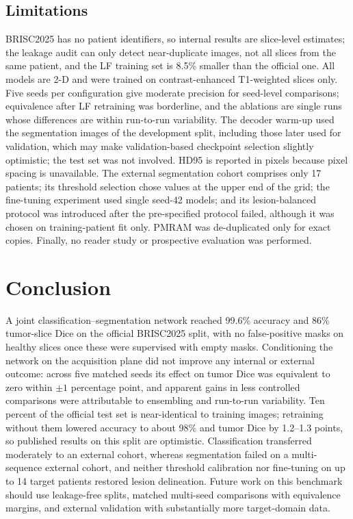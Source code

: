 \documentclass[journal]{IEEEtran}
\begin{document}
\subsection{Limitations}
BRISC2025 has no patient identifiers, so internal results are slice-level estimates; the leakage audit can only detect near-duplicate images, not all slices from the same patient, and the LF training set is 8.5\% smaller than the official one. All models are 2-D and were trained on contrast-enhanced T1-weighted slices only. Five seeds per configuration give moderate precision for seed-level comparisons; equivalence after LF retraining was borderline, and the ablations are single runs whose differences are within run-to-run variability. The decoder warm-up used the segmentation images of the development split, including those later used for validation, which may make validation-based checkpoint selection slightly optimistic; the test set was not involved. HD95 is reported in pixels because pixel spacing is unavailable. The external segmentation cohort comprises only 17 patients; its threshold selection chose values at the upper end of the grid; the fine-tuning experiment used single seed-42 models; and its lesion-balanced protocol was introduced after the pre-specified protocol failed, although it was chosen on training-patient fit only. PMRAM was de-duplicated only for exact copies. Finally, no reader study or prospective evaluation was performed.

\section{Conclusion}
A joint classification--segmentation network reached 99.6\% accuracy and 86\% tumor-slice Dice on the official BRISC2025 split, with no false-positive masks on healthy slices once these were supervised with empty masks. Conditioning the network on the acquisition plane did not improve any internal or external outcome: across five matched seeds its effect on tumor Dice was equivalent to zero within $\pm1$ percentage point, and apparent gains in less controlled comparisons were attributable to ensembling and run-to-run variability. Ten percent of the official test set is near-identical to training images; retraining without them lowered accuracy to about 98\% and tumor Dice by 1.2--1.3 points, so published results on this split are optimistic. Classification transferred moderately to an external cohort, whereas segmentation failed on a multi-sequence external cohort, and neither threshold calibration nor fine-tuning on up to 14 target patients restored lesion delineation. Future work on this benchmark should use leakage-free splits, matched multi-seed comparisons with equivalence margins, and external validation with substantially more target-domain data.
\end{document}
